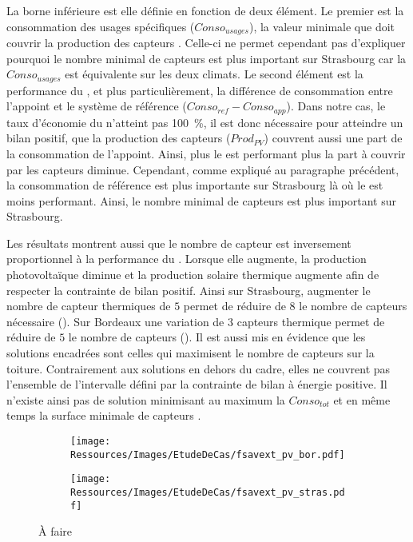 La borne inférieure est elle définie en fonction de deux élément. Le premier est la
consommation des usages spécifiques ($Conso_{usages}$), la valeur minimale que doit
couvrir la production des capteurs . Celle-ci ne permet cependant pas d’expliquer
pourquoi le nombre minimal de capteurs  est plus important sur Strasbourg car la
$Conso_{usages}$ est équivalente sur les deux climats. Le second élément est la
performance du , et plus particulièrement, la différence de consommation entre
l’appoint et le système de référence ($Conso_{ref} - Conso_{app}$). Dans notre cas, le
taux d’économie du  n’atteint pas \SI{100}{\percent}, il est donc nécessaire pour
atteindre un bilan positif, que la production des capteurs  ($Prod_{PV}$) couvrent
aussi une part de la consommation de l’appoint. Ainsi, plus le  est performant
plus la part à couvrir par les capteurs  diminue.
Cependant, comme expliqué au paragraphe précédent, la consommation de référence est plus
importante sur Strasbourg là où le  est moins performant. Ainsi, le nombre
minimal de capteurs  est plus important sur Strasbourg.

Les résultats montrent aussi que le nombre de capteur  est inversement
proportionnel à la performance du . Lorsque elle augmente, la production
photovoltaïque diminue et la production solaire thermique augmente afin de respecter la
contrainte de bilan positif. Ainsi sur Strasbourg, augmenter le nombre de capteur
thermiques de $5$ permet de réduire de $8$ le nombre de capteurs  nécessaire
(). Sur Bordeaux une variation de $3$ capteurs thermique permet
de réduire de $5$ le nombre de capteurs  (). Il est aussi
mis en évidence que les solutions encadrées sont celles qui maximisent le nombre de
capteurs  sur la toiture. Contrairement aux solutions en dehors du cadre, elles ne
couvrent pas l’ensemble de l’intervalle défini par la contrainte de bilan à énergie
positive. Il n’existe ainsi pas de solution minimisant au maximum la $Conso_{tot}$ et en
même temps la surface minimale de capteurs .

\begin{figure}
    \centering
    \begin{subfigure}[b]{0.48\textwidth}
        \centering
        \texttt{[image: Ressources/Images/EtudeDeCas/fsavext\_pv\_bor.pdf]}
        \caption{}
        \label{fig:fsav_pv_bor}
    \end{subfigure}
    \quad
    \begin{subfigure}[b]{0.48\textwidth}
        \centering
        \texttt{[image: Ressources/Images/EtudeDeCas/fsavext\_pv\_stras.pdf]}
        \caption{}
        \label{fig:fsav_pv_stras}
    \end{subfigure}
    \caption[À faire]
             {À faire}
    \label{fig:fsav_pv_bor_stras}
\end{figure}


